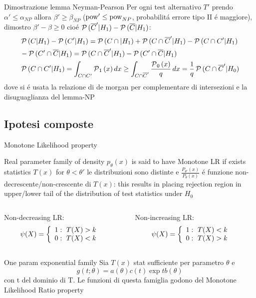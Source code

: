 \begin{wordonframe}{Dimostrazione lemma Neyman-Pearson}
Per ogni test alternativo $T'$ prendo $\alpha'\leq\alpha_{NP}$ allora $\beta'\geq\beta_{NP}$ ($\operatorname{pow}'\leq\operatorname{pow}_{NP}$, probabilit\'a errore tipo II \'e maggiore), dimostro $\beta'-\beta\geq0$ cio\'e $\operatorname{\mathcal{P}}{(\overline{C}'|H_1)}-\operatorname{\mathcal{P}}{(\overline{C}|H_1)}$:
\begin{align*}
&\operatorname{\mathcal{P}}{(C|H_1)}-\operatorname{\mathcal{P}}{(C'|H_1)}=\operatorname{\mathcal{P}}{(C\cap|H_1)}+\operatorname{\mathcal{P}}{(C\cap\overline{C}'|H_1)}-\operatorname{\mathcal{P}}{(C\cap C'|H_1)}\\
&-\operatorname{\mathcal{P}}{(C'\cap\overline{C}|H_1)}=\operatorname{\mathcal{P}}{(C\cap\overline{C}'|H_1)}-\operatorname{\mathcal{P}}{(C'\cap\overline{C}|H_1)}\\
&\operatorname{\mathcal{P}}{(C\cap C'|H_1)}=\int_{C\cap C'}\operatorname{\mathcal{P}}_1{(x)}\,dx\geq\int_{C\cap \overline{C}'}\frac{\operatorname{\mathcal{P}}_0{(x)}}{q}\,dx=\frac{1}{q}\operatorname{\mathcal{P}}{(C\cap\overline{C}'|H_0)}
\end{align*}
dove si \'e usata la relazione di de morgan per complementare di intersezioni e la disuguaglianza del lemma-NP
\end{wordonframe}

\subsection{Ipotesi composte}

\begin{frame}{Monotone Likelihood property}\frameintoc
\begin{block}{}
Real parameter family of density $p_{\theta}(x)$ is said to have Monotone LR if exists statistics $T(x)$ for $\theta<\theta'$ le distribuzioni sono distinte e $\frac{P_{\theta'}(x)}{P_{\theta}(x)}$ \'e funzione non-decrescente/non-crescente di $T(x)$: this results in placing rejection region in upper/lower tail of the distribution of test statistics under $H_0$
\begin{columns}[T]
	\begin{column}{0.5\textwidth}
		Non-decreasing LR:
		\begin{align*}
		&\psi(X)=\left\{\begin{array}{l}1:\ T(X)>k\\0:\ T(X)<k\\ \end{array}\right.
		\end{align*}
	\end{column}
	\begin{column}{0.5\textwidth}
		Non-increasing LR:
		\begin{align*}
		&\psi(X)=\left\{\begin{array}{l}1:\ T(X)<k\\0:\ T(X)>k\\ \end{array}\right.
		\end{align*}
	\end{column}
\end{columns}
\end{block}
\begin{block}{One param exponential family}
Sia $T(x)$ stat sufficiente per parametro $\theta$ e 
\begin{equation*}
g(t;\theta)=a(\theta)c(t)\exp{tb(\theta)}
\end{equation*}
con t del dominio di T. Le funzioni di questa famiglia godono del Monotone Likelihood Ratio property
\end{block}
\end{frame}


